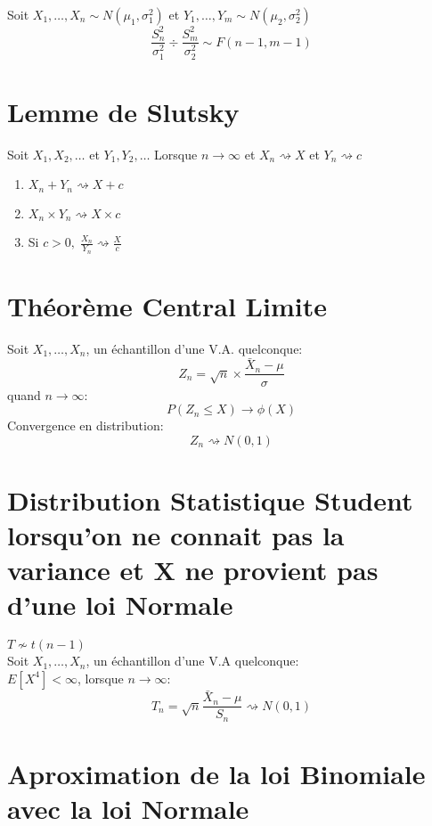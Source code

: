 \documentclass[]{book}
\providecommand{\tightlist}{%
  \setlength{\itemsep}{0pt}\setlength{\parskip}{0pt}}
\theoremstyle{definition}
\theoremstyle{definition}
\theoremstyle{definition}
\theoremstyle{remark}
\let\BeginKnitrBlock\begin \let\EndKnitrBlock\end
\begin{document}
Soit \(X_1,\dots,X_n\sim N(\mu_1,\sigma^2_1)\) et
\(Y_1,\dots,Y_m\sim N(\mu_2,\sigma^2_2)\) \[
\dfrac{S^2_n}{\sigma^2_1}\div\dfrac{S_m^2}{\sigma^2_2}\sim F(n-1,m-1)
\]

\section{Lemme de Slutsky}\label{lemme-de-slutsky}

Soit \(X_1,X_2,\dots\) et \(Y_1,Y_2,\dots\) Lorsque
\(n \rightarrow \infty\) et \(X_n \rightsquigarrow X\) et
\(Y_n \rightsquigarrow c\)

\begin{enumerate}
\def\labelenumi{\arabic{enumi}.}
\tightlist
\item
  \(X_n+Y_n \rightsquigarrow X+c\)
\item
  \(X_n\times Y_n \rightsquigarrow X\times c\)
\item
  Si \(c>0,\; \frac{X_n}{Y_n} \rightsquigarrow \frac{X}{c}\)
\end{enumerate}

\section{Théorème Central Limite}\label{stats:tcl}

\BeginKnitrBlock{theorem}
\protect\hypertarget{thm:unnamed-chunk-1}{}{\label{thm:unnamed-chunk-1}
}Soit \(X_1,\dots,X_n\), un échantillon d'une V.A. quelconque: \[
Z_n=\sqrt{n}\times\frac{\bar{X}_n-\mu}{\sigma}
\] quand \(n \to \infty\): \[
P(Z_n\le X)\to\phi(X)
\] Convergence en distribution: \[
Z_n\rightsquigarrow N(0,1)
\]
\EndKnitrBlock{theorem}

\section{Distribution Statistique Student lorsqu'on ne connait pas la
variance et X ne provient pas d'une loi
Normale}\label{distribution-statistique-student-lorsquon-ne-connait-pas-la-variance-et-x-ne-provient-pas-dune-loi-normale}

\(T \not\sim t(n-1)\)\\
Soit \(X_1,\dots,X_n\), un échantillon d'une V.A quelconque:\\
\(E[X^4]<\infty\), lorsque \(n\to\infty\): \[
T_n = \sqrt{n}\frac{\bar{X}_n-\mu}{S_n}\rightsquigarrow N(0,1)
\]

\section{Aproximation de la loi Binomiale avec la loi
Normale}\label{aproximation-de-la-loi-binomiale-avec-la-loi-normale}
\end{document}
